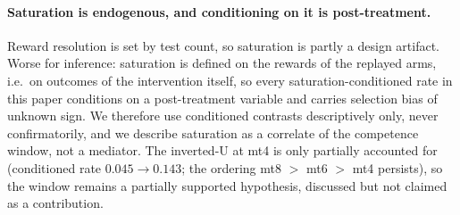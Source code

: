 \documentclass{article}
\theoremstyle{remark}
\begin{document}
\paragraph{Saturation is endogenous, and conditioning on it is
post-treatment.} Reward resolution is set by test count, so saturation is
partly a design artifact. Worse for inference: saturation is defined on the
rewards of the replayed arms, i.e.\ on outcomes of the intervention itself,
so every saturation-conditioned rate in this paper conditions on a
post-treatment variable and carries selection bias of unknown sign. We
therefore use conditioned contrasts descriptively only, never
confirmatorily, and we describe saturation as a correlate of the competence
window, not a mediator. The inverted-U at mt4 is only partially accounted
for (conditioned rate $0.045 \to 0.143$; the ordering mt8 $>$ mt6 $>$ mt4
persists), so the window remains a partially supported hypothesis,
discussed but not claimed as a contribution.
\end{document}
